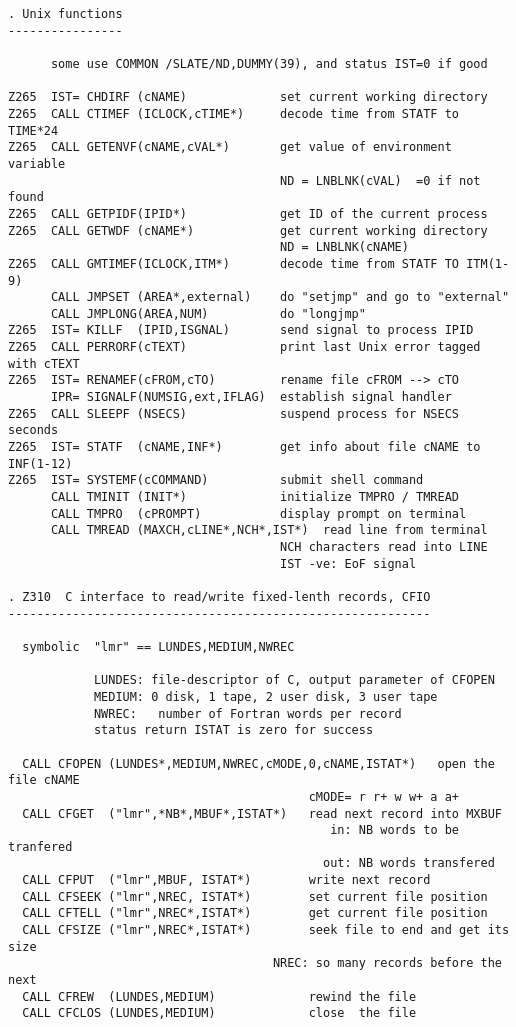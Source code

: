 \begin{verbatim}
. Unix functions
----------------

      some use COMMON /SLATE/ND,DUMMY(39), and status IST=0 if good

Z265  IST= CHDIRF (cNAME)             set current working directory
Z265  CALL CTIMEF (ICLOCK,cTIME*)     decode time from STATF to TIME*24
Z265  CALL GETENVF(cNAME,cVAL*)       get value of environment variable
                                      ND = LNBLNK(cVAL)  =0 if not found
Z265  CALL GETPIDF(IPID*)             get ID of the current process
Z265  CALL GETWDF (cNAME*)            get current working directory
                                      ND = LNBLNK(cNAME)
Z265  CALL GMTIMEF(ICLOCK,ITM*)       decode time from STATF TO ITM(1-9)
      CALL JMPSET (AREA*,external)    do "setjmp" and go to "external"
      CALL JMPLONG(AREA,NUM)          do "longjmp"
Z265  IST= KILLF  (IPID,ISGNAL)       send signal to process IPID
Z265  CALL PERRORF(cTEXT)             print last Unix error tagged with cTEXT
Z265  IST= RENAMEF(cFROM,cTO)         rename file cFROM --> cTO
      IPR= SIGNALF(NUMSIG,ext,IFLAG)  establish signal handler
Z265  CALL SLEEPF (NSECS)             suspend process for NSECS seconds
Z265  IST= STATF  (cNAME,INF*)        get info about file cNAME to INF(1-12)
Z265  IST= SYSTEMF(cCOMMAND)          submit shell command
      CALL TMINIT (INIT*)             initialize TMPRO / TMREAD
      CALL TMPRO  (cPROMPT)           display prompt on terminal
      CALL TMREAD (MAXCH,cLINE*,NCH*,IST*)  read line from terminal
                                      NCH characters read into LINE
                                      IST -ve: EoF signal

. Z310  C interface to read/write fixed-lenth records, CFIO
-----------------------------------------------------------

  symbolic  "lmr" == LUNDES,MEDIUM,NWREC

            LUNDES: file-descriptor of C, output parameter of CFOPEN
            MEDIUM: 0 disk, 1 tape, 2 user disk, 3 user tape
            NWREC:   number of Fortran words per record
            status return ISTAT is zero for success

  CALL CFOPEN (LUNDES*,MEDIUM,NWREC,cMODE,0,cNAME,ISTAT*)   open the file cNAME
                                          cMODE= r r+ w w+ a a+
  CALL CFGET  ("lmr",*NB*,MBUF*,ISTAT*)   read next record into MXBUF
                                             in: NB words to be tranfered
                                            out: NB words transfered
  CALL CFPUT  ("lmr",MBUF, ISTAT*)        write next record
  CALL CFSEEK ("lmr",NREC, ISTAT*)        set current file position
  CALL CFTELL ("lmr",NREC*,ISTAT*)        get current file position
  CALL CFSIZE ("lmr",NREC*,ISTAT*)        seek file to end and get its size
                                     NREC: so many records before the next
  CALL CFREW  (LUNDES,MEDIUM)             rewind the file
  CALL CFCLOS (LUNDES,MEDIUM)             close  the file
\end{verbatim}

